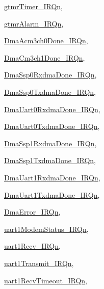 \begin{DoxyCompactItemize}
\hyperlink{a00468_a666eb0caeb12ec0e281415592ae89083a6dce2e0f835a432bcc36f793fdf9eb30}{gtmrTimer\_\-IRQn}, 
\par
\hyperlink{a00468_a666eb0caeb12ec0e281415592ae89083a44352825248704cb35dd290b84bd1cfa}{gtmrAlarm\_\-IRQn}, 
\par
\hyperlink{a00468_a666eb0caeb12ec0e281415592ae89083ab2192b9cbbc2ec2d553fe930412ded67}{DmaAcm3ch0Done\_\-IRQn}, 
\par
\hyperlink{a00468_a666eb0caeb12ec0e281415592ae89083a08e588fc128c08dc81c6519a56ddc3c7}{DmaCm3ch1Done\_\-IRQn}, 
\par
\hyperlink{a00468_a666eb0caeb12ec0e281415592ae89083ae53793dbfe19ef6225580f5f6fde4bbd}{DmaSsp0RxdmaDone\_\-IRQn}, 
\par
\hyperlink{a00468_a666eb0caeb12ec0e281415592ae89083a4aed3cfd536d1b03ab068c5d69f8b018}{DmaSsp0TxdmaDone\_\-IRQn}, 
\par
\hyperlink{a00468_a666eb0caeb12ec0e281415592ae89083a51723cf94a1a306e3d670cb37c0d603f}{DmaUart0RxdmaDone\_\-IRQn}, 
\par
\hyperlink{a00468_a666eb0caeb12ec0e281415592ae89083af279f856b1de4dd4750a050723572d85}{DmaUart0TxdmaDone\_\-IRQn}, 
\par
\hyperlink{a00468_a666eb0caeb12ec0e281415592ae89083ae3acf07931e4aa8bef4d95c63b16a6c2}{DmaSsp1RxdmaDone\_\-IRQn}, 
\par
\hyperlink{a00468_a666eb0caeb12ec0e281415592ae89083a69dea24b51953af7f38ba3a333c97306}{DmaSsp1TxdmaDone\_\-IRQn}, 
\par
\hyperlink{a00468_a666eb0caeb12ec0e281415592ae89083a231818d98018e7b075f5fb382847e9e6}{DmaUart1RxdmaDone\_\-IRQn}, 
\par
\hyperlink{a00468_a666eb0caeb12ec0e281415592ae89083a89bf466783ffabe83bbbfaafc1b24306}{DmaUart1TxdmaDone\_\-IRQn}, 
\par
\hyperlink{a00468_a666eb0caeb12ec0e281415592ae89083a471712472c5fb6e44abb8af2f6bb4320}{DmaError\_\-IRQn}, 
\par
\hyperlink{a00468_a666eb0caeb12ec0e281415592ae89083a587705b0d1ade811e35066cfb866f042}{uart1ModemStatus\_\-IRQn}, 
\par
\hyperlink{a00468_a666eb0caeb12ec0e281415592ae89083abcbb045f3f53ab779cd0cf76330e5ad2}{uart1Recv\_\-IRQn}, 
\par
\hyperlink{a00468_a666eb0caeb12ec0e281415592ae89083a38eeafb533ae619fcc834b5c819ce996}{uart1Transmit\_\-IRQn}, 
\par
\hyperlink{a00468_a666eb0caeb12ec0e281415592ae89083a6294896a93715dd2b8e1207ba566de48}{uart1RecvTimeout\_\-IRQn}, 

\end{DoxyCompactItemize}
